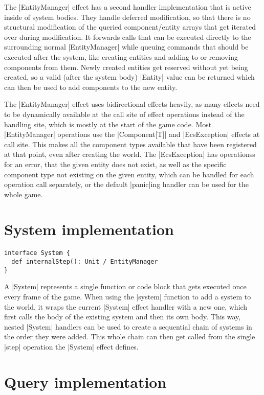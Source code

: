 The |EntityManager| effect has a second handler implementation that is active inside of system bodies. They handle deferred modification, so that there is no structural modification of the queried component/entity arrays that get iterated over during modification. It forwards calls that can be executed directly to the surrounding normal |EntityManager| while queuing commands that should be executed after the system, like creating entities and adding to or removing components from them. Newly created entities get reserved without yet being created, so a valid (after the system body) |Entity| value can be returned which can then be used to add components to the new entity.

The |EntityManager| effect uses bidirectional effects heavily, as many effects need to be dynamically available at the call site of effect operations instead of the handling site, which is mostly at the start of the game code. Most |EntityManager| operations use the |Component[T]| and |EcsException| effects at call site. This makes all the component types available that have been registered at that point, even after creating the world. The |EcsException| has operationss for an error, that the given entity does not exist, as well as the specific component type not existing on the given entity, which can be handled for each operation call separately, or the default |panic|ing handler can be used for the whole game.

\section{System implementation}

\begin{lstlisting}[caption=System signiture]
interface System {
  def internalStep(): Unit / EntityManager
}
\end{lstlisting}

A |System| represents a single function or code block that gets executed once every frame of the game. When using the |system| function to add a system to the world, it wraps the current |System| effect handler with a new one, which first calls the body of the existing system and then its own body. This way, nested |System| handlers can be used to create a sequential chain of systems in the order they were added. This whole chain can then get called from the single |step| operation the |System| effect defines.

\section{Query implementation}


